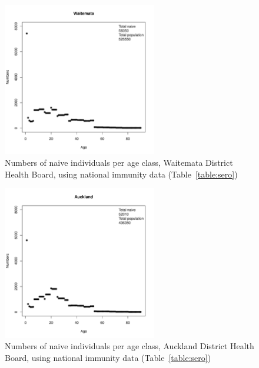 \documentclass{article}
\begin{document}
\begin{figure}[H]
     \begin{center}
     \includegraphics[width=0.6\textwidth]{dhb2.pdf}
     \end{center}
     \caption{Numbers of naive individuals per age class, Waitemata District Health Board, using national immunity data (Table~\ref{table:sero})}
     \label{fig:Waitemata}
\end{figure}

\begin{figure}[H]
     \begin{center}
     \includegraphics[width=0.6\textwidth]{dhb3.pdf}
     \end{center}
     \caption{Numbers of naive individuals per age class, Auckland District Health Board, using national immunity data (Table~\ref{table:sero})}
     \label{fig:Auckland}
\end{figure}
\end{document}
